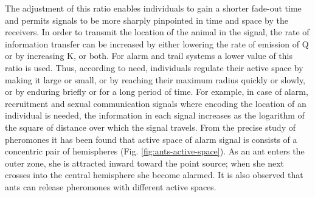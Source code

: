 The adjustment of this ratio enables individuals to gain a shorter fade-out time and permits signals to be more sharply pinpointed in time and space by the receivers. In order to transmit the location of the animal in the signal, the rate of information transfer can be increased by either lowering the rate of emission of Q or by increasing K, or both. For alarm and trail systems a lower value of this ratio is used. Thus, according to need, individuals regulate their active space by making it large or small, or by reaching their maximum radius quickly or slowly, or by enduring briefly or for a long period of time. For example, in case of alarm, recruitment and sexual communication signals where encoding the location of an individual is needed, the information in each signal increases as the logarithm of the square of distance over which the signal travels. From the precise study of pheromones it has been found that active space of alarm signal is consists of a concentric pair of hemispheres (Fig. \ref{fig:ants-active-space}). As an ant enters the outer zone, she is attracted inward toward the point source; when she next crosses into the central hemisphere she become alarmed. It is also observed that ants can release pheromones with different active spaces.

